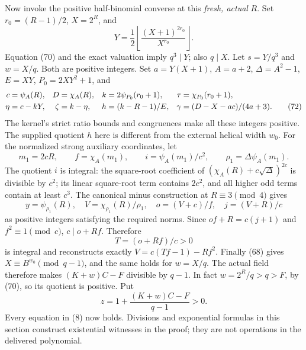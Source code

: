 \documentclass[11pt,a4paper]{article}
\theoremstyle{definition}
\theoremstyle{remark}
\begin{document}
Now invoke the positive half-binomial converse at this \emph{fresh,
actual} \(R\). Set \(r_0=(R-1)/2\), \(X=2^R\), and
\[
 Y=\frac12\left\lfloor
          \frac{(X+1)^{2r_0}}{X^{r_0}}\right\rfloor. \tag{71}
\]
Equation (70) and the exact valuation imply
\(q^3\mid Y\); also \(q\mid X\). Let \(s=Y/q^3\) and
\(w=X/q\). Both are positive integers.
Set \(a=Y(X+1)\), \(A=a+2\), \(\Delta=A^2-1\),
\(E=XY\), \(P_0=2XY^2+1\), and
\begin{align}
 c&=\psi_A(R),& D&=\chi_A(R),&
 k&=2\psi_{P_0}(r_0+1),& \tau&=\chi_{P_0}(r_0+1),\notag\\
 \eta&=c-kY,&\zeta&=k-\eta,&
 h&=(k-R-1)/E,&
 \gamma&=(D-X-ac)/(4a+3). \tag{72}
\end{align}
The kernel's strict ratio bounds and congruences make all these
integers positive. The supplied quotient \(h\) here is different
from the external helical width \(w_0\).
For the normalized strong auxiliary coordinates, let
\[
 m_1=2cR,\qquad
 f=\chi_A(m_1),\qquad i=\psi_A(m_1)/c^2,\qquad
 \rho_1=\Delta\psi_A(m_1). \tag{73}
\]
The quotient \(i\) is integral: the square-root coefficient of
\((\chi_A(R)+c\sqrt\Delta)^{2c}\) is divisible by \(c^2\);
its linear square-root term contains \(2c^2\), and all higher
odd terms contain at least \(c^3\).
The canonical minus construction \cite{halfbinomial,normalized}
at \(R\equiv3\pmod4\) gives
\[
 y=\psi_{\rho_1}(R),\quad
 V=\chi_{\rho_1}(R)/\rho_1,\quad
 o=(V+c)/f,\quad j=(V+R)/c \tag{74}
\]
as positive integers satisfying the required norms.
Since \(of+R=c(j+1)\) and \(f^2\equiv1\pmod c\),
\(c\mid o+Rf\). Therefore
\[
 T=(o+Rf)/c>0 \tag{75}
\]
is integral and reconstructs exactly \(V=c(Tf-1)-Rf^2\).
Finally (68) gives \(X\equiv B^{w_0}\pmod{q-1}\), and the
same holds for \(w=X/q\). The actual field therefore makes
\((K+w)C-F\) divisible by \(q-1\).
In fact \(w=2^R/q>q>F\), by (70), so its quotient is
positive. Put
\[
 z=1+\frac{(K+w)C-F}{q-1}>0. \tag{76}
\]
Every equation in (8) now holds. Divisions and exponential formulas
in this section construct existential witnesses in the proof; they
are not operations in the delivered polynomial.
\end{document}

